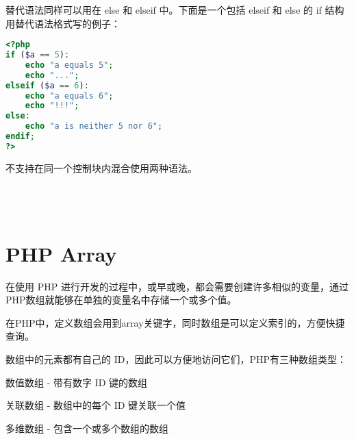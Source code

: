 替代语法同样可以用在 else 和 elseif 中。下面是一个包括 elseif 和 else 的 if 结构用替代语法格式写的例子：


\begin{lstlisting}[language=PHP]
<?php
if ($a == 5):
    echo "a equals 5";
    echo "...";
elseif ($a == 6):
    echo "a equals 6";
    echo "!!!";
else:
    echo "a is neither 5 nor 6";
endif;
?>
\end{lstlisting}

不支持在同一个控制块内混合使用两种语法。




\begin{lstlisting}[language=PHP]

\end{lstlisting}




\begin{lstlisting}[language=PHP]

\end{lstlisting}




\begin{lstlisting}[language=PHP]

\end{lstlisting}




\begin{lstlisting}[language=PHP]

\end{lstlisting}

\chapter{PHP Array}



在使用 PHP 进行开发的过程中，或早或晚，都会需要创建许多相似的变量，通过PHP数组就能够在单独的变量名中存储一个或多个值。

在PHP中，定义数组会用到array关键字，同时数组是可以定义索引的，方便快捷查询。

数组中的元素都有自己的 ID，因此可以方便地访问它们，PHP有三种数组类型：

\begin{compactitem}
\item 数值数组 - 带有数字 ID 键的数组

\item 关联数组 - 数组中的每个 ID 键关联一个值

\item 多维数组 - 包含一个或多个数组的数组
\end{compactitem}






